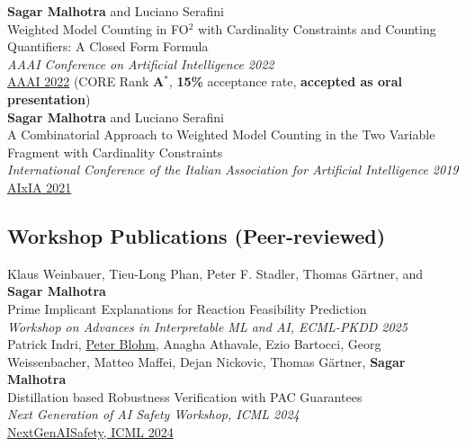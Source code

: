 \documentclass[10pt, a4paper]{article}
\newcommand{\years}[1]{\marginnote{\scriptsize #1}}
\begin{document}

\years{2022}\textbf{Sagar Malhotra} and Luciano Serafini\\ 
Weighted Model Counting in FO$^2$ with Cardinality Constraints and Counting Quantifiers: A Closed Form Formula \\ \emph{AAAI Conference on Artificial Intelligence 2022}\\
\href{https://ojs.aaai.org/index.php/AAAI/article/view/20525}{AAAI 2022} (CORE Rank \textbf{A$^{*}$}, \textbf{15\%} acceptance rate, \textbf{accepted as oral presentation}) \\

\years{2021}\textbf{Sagar Malhotra} and Luciano Serafini\\
 A Combinatorial Approach to Weighted Model Counting in the Two Variable Fragment with Cardinality Constraints\\ \emph{International Conference of the Italian Association for Artificial Intelligence 2019}\\
\href{https://link.springer.com/chapter/10.1007/978-3-031-08421-8_10}{AIxIA 2021}

\subsection*{Workshop Publications (Peer-reviewed)}
\years{2025} Klaus Weinbauer, Tieu-Long Phan, Peter F. Stadler,
Thomas Gärtner, and \textbf{Sagar Malhotra}\\
Prime Implicant Explanations for Reaction Feasibility Prediction\\
\emph{Workshop on Advances in Interpretable ML and AI, ECML-PKDD 2025}\\

\years{2024} Patrick Indri, \underline{Peter Blohm}, Anagha Athavale, Ezio Bartocci, Georg Weissenbacher, Matteo Maffei, Dejan Nickovic, Thomas Gärtner, \textbf{Sagar Malhotra}\\
Distillation based Robustness Verification with PAC Guarantees\\
\emph{Next Generation of AI Safety Workshop, ICML 2024}\\
\href{https://openreview.net/forum?id=vflefS3lmB}{NextGenAISafety, ICML 2024}\\
\end{document}
